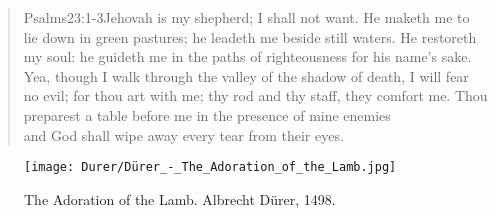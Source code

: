 \begin{verse}
				{Psalms}{23:1-3}{Jehovah is my shepherd; I shall not want. He maketh me to lie down in green pastures; he leadeth me beside still waters. He restoreth my soul: he guideth me in the paths of righteousness for his name’s sake. Yea, though I walk through the valley of the shadow of death, I will fear no evil; for thou art with me; thy rod and thy staff, they comfort me. Thou preparest a table before me in the presence of mine enemies}\\
 and God shall wipe away every tear from their eyes.%
\end{verse}
\begin{figure*}[p]
  	\centering
  	\texttt{[image: Durer/Dürer\_-\_The\_Adoration\_of\_the\_Lamb.jpg]}
  	\caption[The Adoration of the Lamb]{The Adoration of the Lamb. Albrecht Dürer, 1498.}
  \end{figure*}
